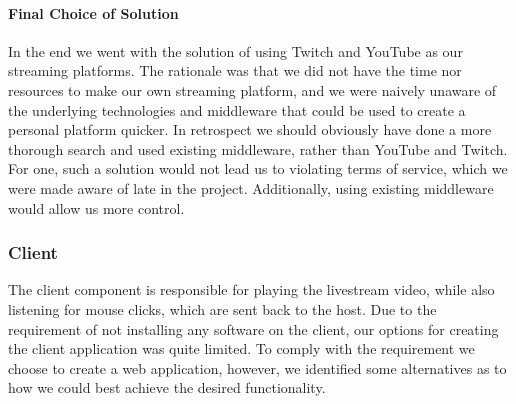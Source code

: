 \paragraph{Final Choice of Solution}
\label{par:stream_dist_final}
In the end we went with the solution of using Twitch and YouTube as our streaming platforms. The rationale was that we did not have the time nor resources to make our own streaming platform, and we were naively unaware of the underlying technologies and middleware that could be used to create a personal platform quicker. In retrospect we should obviously have done a more thorough search and used existing middleware, rather than YouTube and Twitch. For one, such a solution would not lead us to violating terms of service\cite[5.1 G]{youtube_guidelines}, which we were made aware of late in the project. Additionally, using existing middleware would allow us more control. 























\subsubsection{Client} %
The client component is responsible for playing the livestream video, while also listening for mouse clicks, which are sent back to the host.
Due to the requirement of not installing any software on the client, our options for creating the client application was quite limited. 
To comply with the requirement we choose to create a web application, however, we identified some alternatives as to how we could best achieve the desired functionality.

